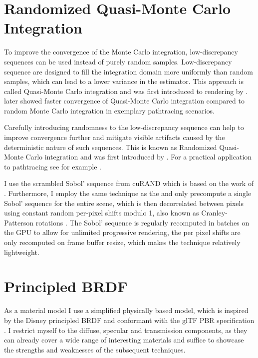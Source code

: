 \section{Randomized Quasi-Monte Carlo Integration}

To improve the convergence of the Monte Carlo integration, low-discrepancy sequences can be used instead of purely random samples.
Low-discrepancy sequence are designed to fill the integration domain more uniformly than random samples, which can lead to a lower variance in the estimator.
This approach is called Quasi-Monte Carlo integration and was first introduced to rendering by \textcite{heinrich1994a}.
\textcite{keller1996a} later showed faster convergence of Quasi-Monte Carlo integration compared to random Monte Carlo integration in exemplary pathtracing scenarios.

Carefully introducing randomness to the low-discrepancy sequence can help to improve convergence further and mitigate visible artifacts caused by the deterministic nature of such sequences.
This is known as Randomized Quasi-Monte Carlo integration and was first introduced by \textcite{owen1995}.
For a practical application to pathtracing see for example \textcite{burley2020}.

I use the scrambled Sobol' sequence from cuRAND  which is based on the work of \textcite{owen2008}.
Furthermore, I employ the same technique as the \textcite{blenderfoundation} and only precompute a single Sobol' sequence for the entire scene, which is then decorrelated between pixels using constant random per-pixel shifts modulo 1, also known as Cranley-Patterson rotations .
The Sobol' sequence is regularly recomputed in batches on the GPU to allow for unlimited progressive rendering, the per pixel shifts are only recomputed on frame buffer resize, which makes the technique relatively lightweight.

\section{Principled BRDF}

As a material model I use a simplified physically based model, which is inspired by the Disney principled BRDF  and conformant with the glTF PBR specification .
I restrict myself to the diffuse, specular and transmission components, as they can already cover a wide range of interesting materials and suffice to showcase the strengths and weaknesses of the subsequent techniques.

